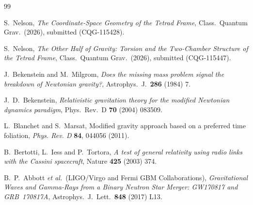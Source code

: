 \documentclass[11pt]{article}
\begin{document}
\begin{thebibliography}{99}

S.~Nelson,
\textit{The Coordinate-Space Geometry of the Tetrad
Frame},
Class.\ Quantum Grav.\ (2026), submitted (CQG-115428).

S.~Nelson,
\textit{The Other Half of Gravity: Torsion and the
Two-Chamber Structure of the Tetrad Frame},
Class.\ Quantum Grav.\ (2026), submitted (CQG-115447).

J.~Bekenstein and M.~Milgrom,
\textit{Does the missing mass problem signal the breakdown
of Newtonian gravity?},
Astrophys.\ J.\ \textbf{286} (1984) 7.

J.~D.~Bekenstein,
\textit{Relativistic gravitation theory for the modified
Newtonian dynamics paradigm},
Phys.\ Rev.\ D \textbf{70} (2004) 083509.

L.~Blanchet and S.~Marsat, Modified gravity approach based on a
preferred time foliation, \textit{Phys. Rev. D} \textbf{84}, 044056
(2011).

B.~Bertotti, L.~Iess and P.~Tortora,
\textit{A test of general relativity using radio links
with the Cassini spacecraft},
Nature \textbf{425} (2003) 374.

B.~P.~Abbott \textit{et al.}\ (LIGO/Virgo and
Fermi GBM Collaborations),
\textit{Gravitational Waves and Gamma-Rays from a Binary
Neutron Star Merger: GW170817 and GRB~170817A},
Astrophys.\ J.\ Lett.\ \textbf{848} (2017) L13.

\end{thebibliography}
\end{document}
